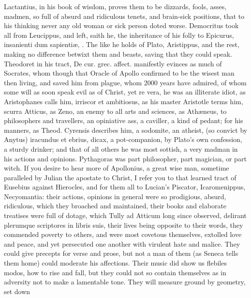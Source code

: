 {Lactantius, in his book of wisdom, proves them to be dizzards,
fools, asses, madmen, so full of absurd and ridiculous tenets, and
brain-sick positions, that to his thinking never any old woman or sick
person doted worse. Democritus took all from Leucippus, and left,
saith he, the inheritance of his folly to Epicurus, insanienti dum
sapienti\ae{}, \etc. The like he holds of Plato, Aristippus, and the rest,
making no difference betwixt them and beasts, saving that they
could speak. Theodoret in his tract, De cur. grec. affect.
manifestly evinces as much of Socrates, whom though that Oracle of
Apollo confirmed to be the wisest man then living, and saved him from
plague, whom 2000 years have admired, of whom some will as soon speak
evil as of Christ, yet re vera, he was an illiterate idiot, as
Aristophanes calls him, irriscor et ambitiosus, as his master
Aristotle terms him, scurra Atticus, as Zeno, an enemy to all arts
and sciences, as Ath\ae{}neus, to philosophers and travellers, an
opiniative ass, a caviller, a kind of pedant; for his manners, as
Theod. Cyrensis describes him, a  sodomite, an atheist, (so
convict by Anytus) iracundus et ebrius, dicax, \etc a pot-companion, by
Plato's own confession, a sturdy drinker; and that of all others
he was most sottish, a very madman in his actions and opinions.
Pythagoras was part philosopher, part magician, or part witch. If you
desire to hear more of Apollonius, a great wise man, sometime
paralleled by Julian the apostate to Christ, I refer you to that
learned tract of Eusebius against Hierocles, and for them all to
Lucian's Piscator, Icaromenippus, Necyomantia: their actions, opinions
in general were so prodigious, absurd, ridiculous, which they broached
and maintained, their books and elaborate treatises were full of
dotage, which Tully ad Atticum long since observed, delirant plerumque
scriptores in libris suis, their lives being opposite to their words,
they commended poverty to others, and were most covetous themselves,
extolled love and peace, and yet persecuted one another with virulent
hate and malice. They could give precepts for verse and prose, but not
a man of them (as Seneca tells them home) could moderate his
affections. Their music did show us flebiles modos, \etc how to rise and
fall, but they could not so contain themselves as in adversity not to
make a lamentable tone. They will measure ground by geometry, set down
}
